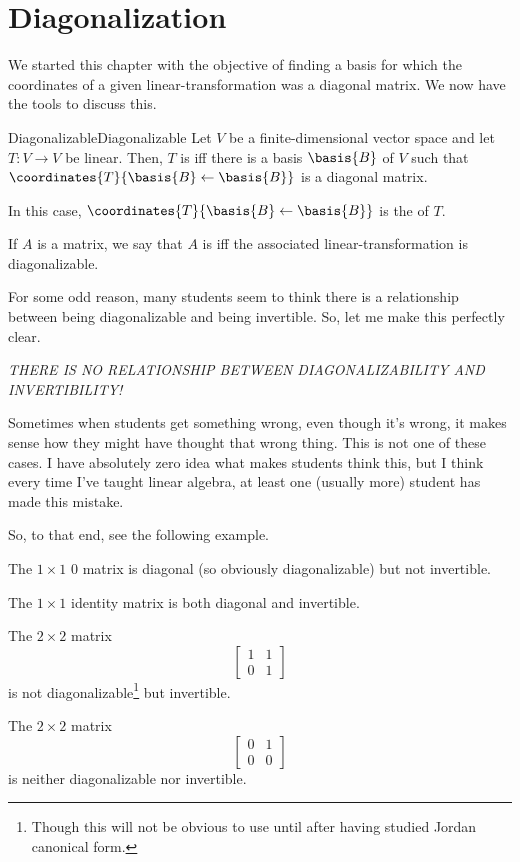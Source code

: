 \section{Diagonalization}

We started this chapter with the objective of finding a basis for which the coordinates of a given linear-transformation was a diagonal matrix.  We now have the tools to discuss this.
\begin{dfn}{Diagonalizable}{Diagonalizable}
	Let $V$ be a finite-dimensional vector space and let $T\colon V\rightarrow V$ be linear.  Then, $T$ is  iff there is a basis $\basis{B}$ of $V$ such that $\coordinates{T}{\basis{B}\leftarrow \basis{B}}$ is a diagonal matrix.
	\begin{rmk}
		In this case, $\coordinates{T}{\basis{B}\leftarrow \basis{B}}$ is the  of $T$.
	\end{rmk}
	\begin{rmk}
		If $A$ is a matrix, we say that $A$ is  iff the associated linear-transformation is diagonalizable.
	\end{rmk}
	\begin{rmk}
		For some odd reason, many students seem to think there is a relationship between being diagonalizable and being invertible.  So, let me make this perfectly clear.
		\begin{important}
			\emph{THERE IS NO RELATIONSHIP BETWEEN DIAGONALIZABILITY AND INVERTIBILITY!}
		\end{important}
		Sometimes when students get something wrong, even though it's wrong, it makes sense how they might have thought that wrong thing.  This is not one of these cases.  I have absolutely zero idea what makes students think this, but I think every time I've taught linear algebra, at least one (usually more) student has made this mistake.
		
		So, to that end, see the following example.
	\end{rmk}
\end{dfn}
\begin{exm}{}{}
	The $1\times 1$ $0$ matrix is diagonal (so obviously diagonalizable) but not invertible.
	
	The $1\times 1$ identity matrix is both diagonal and invertible.
	
	The $2\times 2$ matrix
	\begin{equation}
		\begin{bmatrix}1 & 1 \\ 0 & 1\end{bmatrix}
	\end{equation}
	is not diagonalizable\footnote{Though this will not be obvious to use until after having studied Jordan canonical form.} but invertible.
	
	The $2\times 2$ matrix
	\begin{equation}
		\begin{bmatrix}0 & 1 \\ 0 & 0\end{bmatrix}
	\end{equation}
	is neither diagonalizable nor invertible.
\end{exm}
